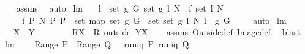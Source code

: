 \begin{isabellebody}
%
\isadelimproof
\ \ %
\endisadelimproof
%
\isatagproof
{}\isamarkupfalse%
\ assms\ \isamarkupfalse%
\ auto%
\endisatagproof
{\isafoldproof}%
%
\isadelimproof
\isanewline
%
\endisadelimproof
\isanewline
{}\isamarkupfalse%
\ lm{}{}{}{\isacharcolon}\ \isanewline
\ \ {\isachardoublequoteopen}{\isacharparenleft}{\isasymforall}l\ {\isasymin}\ set\ {\isacharparenleft}g{}\ G{\isacharparenright}{\isachardot}\ set\ {\isacharparenleft}g{}\ l\ N{\isacharparenright}\ {\isacharequal}\ f{}\ {\isacharparenleft}set\ l{\isacharparenright}\ N{\isacharparenright}\ {\isacharminus}{\isacharminus}{\isachargreater}\ \ \isanewline
\ \ \ \ \ {\isacharbraceleft}f{}\ P\ N{\isacharbar}\ P{\isachardot}\ P\ {\isasymin}\ set\ {\isacharparenleft}map\ set\ {\isacharparenleft}g{}\ G{\isacharparenright}{\isacharparenright}{\isacharbraceright}\ {\isacharequal}\ set\ {\isacharbrackleft}set\ {\isacharparenleft}g{}\ l\ N{\isacharparenright}{\isachardot}\ l\ {\isacharless}{\isacharminus}\ g{}\ G{\isacharbrackright}{\isachardoublequoteclose}\ \isanewline
%
\isadelimproof
\ \ %
\endisadelimproof
%
\isatagproof
{}\isamarkupfalse%
\ auto%
\endisatagproof
{\isafoldproof}%
%
\isadelimproof
\isanewline
%
\endisadelimproof
\isanewline
{}\isamarkupfalse%
\ lm{}{}{}{\isacharcolon}\ \isanewline
\ \ \ {\isachardoublequoteopen}X\ {\isasyminter}\ Y\ \ {\isacharequal}\ \ {\isacharbraceleft}{\isacharbraceright}{\isachardoublequoteclose}\ \isanewline
\ \ \ {\isachardoublequoteopen}R{\isacharbackquote}{\isacharbackquote}X\ {\isacharequal}\ {\isacharparenleft}R\ outside\ Y{\isacharparenright}{\isacharbackquote}{\isacharbackquote}X{\isachardoublequoteclose}\isanewline
%
\isadelimproof
\ \ %
\endisadelimproof
%
\isatagproof
{}\isamarkupfalse%
\ assms\ Outside{\isacharunderscore}def\ Image{\isacharunderscore}def\ \isamarkupfalse%
\ blast%
\endisatagproof
{\isafoldproof}%
%
\isadelimproof
\isanewline
%
\endisadelimproof
\isanewline
{}\isamarkupfalse%
\ lm{}{}{}{\isacharcolon}\ \isanewline
\ \ \ {\isachardoublequoteopen}{\isacharparenleft}Range\ P{\isacharparenright}\ {\isasyminter}\ {\isacharparenleft}Range\ Q{\isacharparenright}\ {\isacharequal}\ {\isacharbraceleft}{\isacharbraceright}{\isachardoublequoteclose}\ {\isachardoublequoteopen}runiq\ {\isacharparenleft}P{\isacharcircum}{\isacharminus}{}{\isacharparenright}{\isachardoublequoteclose}\ {\isachardoublequoteopen}runiq\ {\isacharparenleft}Q{\isacharcircum}{\isacharminus}{}{\isacharparenright}{\isachardoublequoteclose}\ \isanewline

\end{isabellebody}
